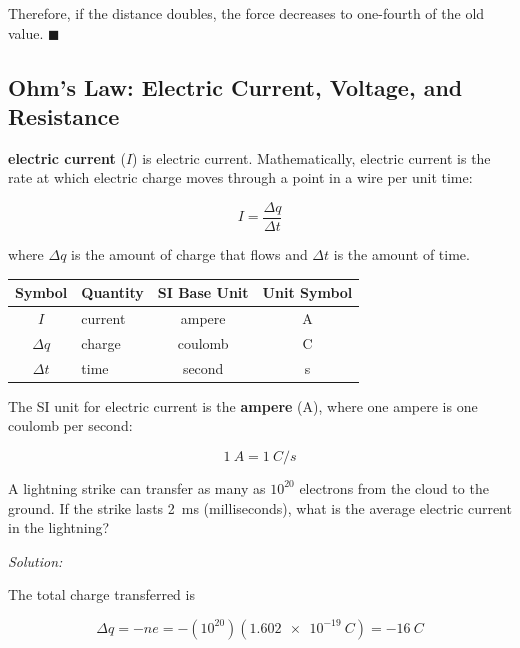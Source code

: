 \documentclass[dvipsnames]{article}
\begin{document}
Therefore, if the distance doubles, the force decreases to one-fourth of the old value. \hfill $\blacksquare$

\clearpage



\subsection{Ohm's Law: Electric Current, Voltage, and Resistance}


\textbf{\Gls{electric current}} ($I$) is \glsdesc{electric current}. Mathematically, electric current is the rate at which electric charge moves through a point in a wire per unit time:

\begin{equation} \label{JzFlJp}
    I = \frac{\Delta q}{\Delta t}
\end{equation}

where $\Delta{q}$ is the amount of charge that flows and $\Delta{t}$ is the amount of time.

\begin{center}
    \begin{tabular}{cl|cc}
    \hline
    \textbf{Symbol} & \textbf{Quantity} & \textbf{SI Base Unit} & \textbf{Unit Symbol}  \\
    \hline\hline
    \rule{0pt}{2.5ex}
        $I$ & current & ampere & A\\
        $\Delta{q}$ & charge & coulomb & C\\
        $\Delta{t}$ & time & second & s\\
    \hline
    \end{tabular}
\end{center}

 The SI unit for electric current is the \textbf{ampere} (A), where one ampere is one coulomb per second:

\begin{equation*}
    \SI{1}{A} = \SI{1}{C/s}
\end{equation*}


\begin{example}
    A lightning strike can transfer as many as $10^{20}$ electrons from the cloud to the ground. If the strike lasts \SI{2}{ms} (milliseconds), what is the average electric current in the lightning?
\end{example}

\textit{Solution:}

The total charge transferred is

\begin{equation*}
    \Delta q = -ne = -(10^{20})(\SI{1.602e-19}{C}) = \SI{-16}{C}
\end{equation*}
\end{document}
